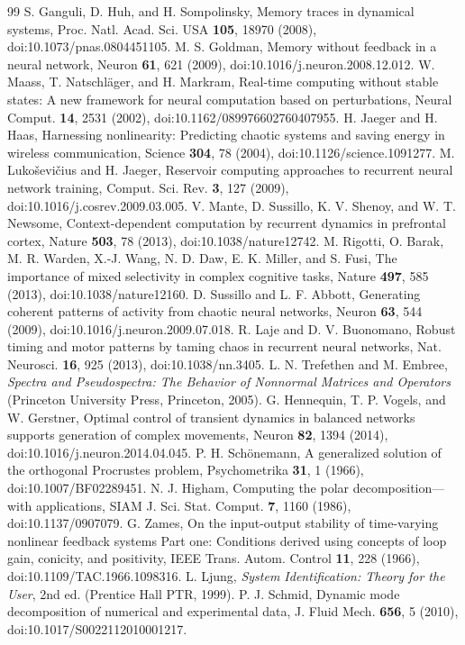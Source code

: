 \documentclass[aps,pre,preprint,superscriptaddress,nofootinbib]{revtex4-2}
\begin{document}
\begin{thebibliography}{99}
 S. Ganguli, D. Huh, and H. Sompolinsky, Memory traces in dynamical systems, Proc. Natl. Acad. Sci. USA \textbf{105}, 18970 (2008), doi:10.1073/pnas.0804451105.
 M. S. Goldman, Memory without feedback in a neural network, Neuron \textbf{61}, 621 (2009), doi:10.1016/j.neuron.2008.12.012.
 W. Maass, T. Natschl\"ager, and H. Markram, Real-time computing without stable states: A new framework for neural computation based on perturbations, Neural Comput. \textbf{14}, 2531 (2002), doi:10.1162/089976602760407955.
 H. Jaeger and H. Haas, Harnessing nonlinearity: Predicting chaotic systems and saving energy in wireless communication, Science \textbf{304}, 78 (2004), doi:10.1126/science.1091277.
 M. Luko\v{s}evi\v{c}ius and H. Jaeger, Reservoir computing approaches to recurrent neural network training, Comput. Sci. Rev. \textbf{3}, 127 (2009), doi:10.1016/j.cosrev.2009.03.005.
 V. Mante, D. Sussillo, K. V. Shenoy, and W. T. Newsome, Context-dependent computation by recurrent dynamics in prefrontal cortex, Nature \textbf{503}, 78 (2013), doi:10.1038/nature12742.
 M. Rigotti, O. Barak, M. R. Warden, X.-J. Wang, N. D. Daw, E. K. Miller, and S. Fusi, The importance of mixed selectivity in complex cognitive tasks, Nature \textbf{497}, 585 (2013), doi:10.1038/nature12160.
 D. Sussillo and L. F. Abbott, Generating coherent patterns of activity from chaotic neural networks, Neuron \textbf{63}, 544 (2009), doi:10.1016/j.neuron.2009.07.018.
 R. Laje and D. V. Buonomano, Robust timing and motor patterns by taming chaos in recurrent neural networks, Nat. Neurosci. \textbf{16}, 925 (2013), doi:10.1038/nn.3405.
 L. N. Trefethen and M. Embree, \textit{Spectra and Pseudospectra: The Behavior of Nonnormal Matrices and Operators} (Princeton University Press, Princeton, 2005).
 G. Hennequin, T. P. Vogels, and W. Gerstner, Optimal control of transient dynamics in balanced networks supports generation of complex movements, Neuron \textbf{82}, 1394 (2014), doi:10.1016/j.neuron.2014.04.045.
 P. H. Sch\"onemann, A generalized solution of the orthogonal Procrustes problem, Psychometrika \textbf{31}, 1 (1966), doi:10.1007/BF02289451.
 N. J. Higham, Computing the polar decomposition---with applications, SIAM J. Sci. Stat. Comput. \textbf{7}, 1160 (1986), doi:10.1137/0907079.
 G. Zames, On the input-output stability of time-varying nonlinear feedback systems Part one: Conditions derived using concepts of loop gain, conicity, and positivity, IEEE Trans. Autom. Control \textbf{11}, 228 (1966), doi:10.1109/TAC.1966.1098316.
 L. Ljung, \textit{System Identification: Theory for the User}, 2nd ed. (Prentice Hall PTR, 1999).
 P. J. Schmid, Dynamic mode decomposition of numerical and experimental data, J. Fluid Mech. \textbf{656}, 5 (2010), doi:10.1017/S0022112010001217.
\end{thebibliography}
\end{document}
